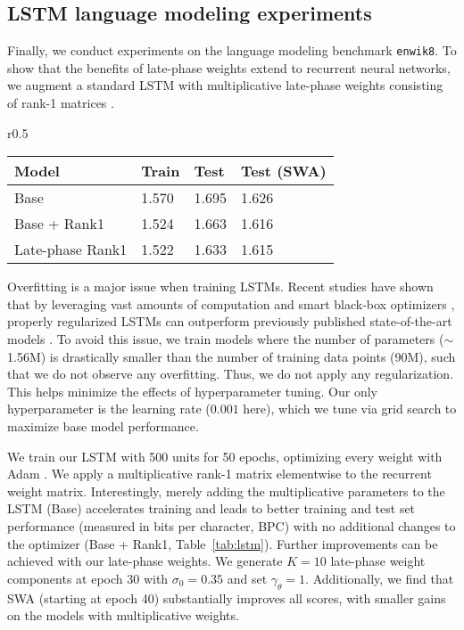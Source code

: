 \documentclass{article} \usepackage{iclr2021_conference,times}
\begin{document}
\subsection{LSTM language modeling experiments}


Finally, we conduct experiments on the language modeling benchmark \texttt{enwik8}. To show that the benefits of late-phase weights extend to recurrent neural networks, we augment a standard LSTM with multiplicative late-phase weights consisting of rank-1 matrices \citep[][cf.~Section~\ref{section:late-phase-models}]{wen_batchensemble_2020}. 

\begin{wraptable}[10]{r}{0.5\textwidth}
  \caption{\texttt{enwik8} results measured in bits per character (BPC), LSTM with 500 units. Mean ~over 5 seeds, with std. $\sigma<0.01$ for all results.}
  \label{tab:lstm}
  \vspace{-0.2cm}
  \centering
  {\renewcommand{\arraystretch}{1.1}\setlength{\tabcolsep}{4pt}
  \begin{tabular}{@{}llll@{}} 
    \toprule
Model & Train & Test & Test (SWA) \\\midrule
Base           &     1.570      &  1.695  & 1.626  \\
Base + Rank1    &      1.524     &  1.663  & 1.616  \\
Late-phase Rank1     &      1.522     &  1.633  &  1.615   \\\bottomrule
\end{tabular}}
\end{wraptable}
Overfitting is a major issue when training LSTMs. Recent studies have shown that by leveraging vast amounts of computation and smart black-box optimizers \citep{golovin_google_2017}, properly regularized LSTMs can outperform previously published state-of-the-art models \citep{melis_state_2017}. To avoid this issue, we train models where the number of parameters ($\sim$1.56M) is drastically smaller than the number of training data points (90M), such that we do not observe any overfitting. Thus, we do not apply any regularization. This helps minimize the effects of hyperparameter tuning. Our only hyperparameter is the learning rate ($0.001$ here), which we tune via grid search to maximize base model performance.

We train our LSTM with 500 units for 50 epochs, optimizing every weight with Adam \citep{kingma_adam:_2015}. We apply a multiplicative rank-1 matrix elementwise to the recurrent weight matrix. Interestingly, merely adding the multiplicative parameters to the LSTM (Base) accelerates training and leads to better training and test set performance (measured in bits per character, BPC) with no additional changes to the optimizer (Base + Rank1, Table~\ref{tab:lstm}). Further improvements can be achieved with our late-phase weights. We generate $K=10$ late-phase weight components at epoch 30 with $\sigma_0=0.35$ and set $\gamma_\theta=1$. 
Additionally, we find that SWA (starting at epoch 40) substantially improves all scores, with smaller gains on the models with multiplicative weights.
\end{document}
